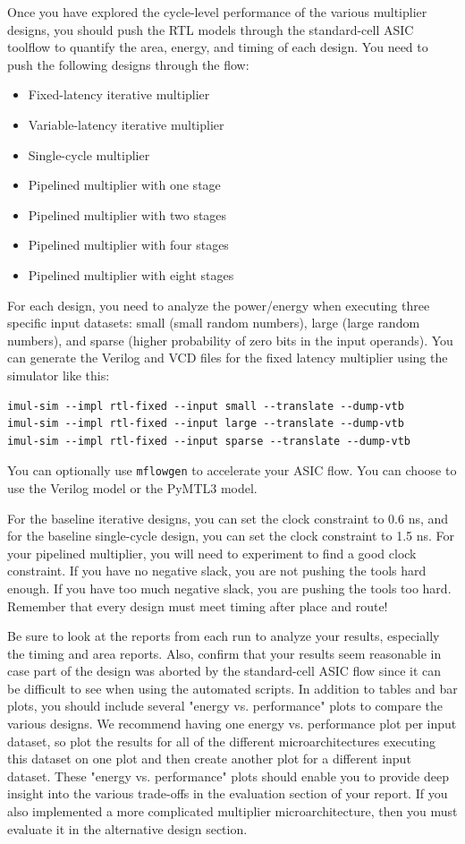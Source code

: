 \documentclass[a4paper,12pt,twoside]{article}
\begin{document}
Once you have explored the cycle-level performance of the various multiplier designs, you should push the RTL models through the standard-cell ASIC toolflow to quantify the area, energy, and timing of each design. You need to push the following designs through the flow:
\begin{itemize}
    \item Fixed-latency iterative multiplier
    \item Variable-latency iterative multiplier
    \item Single-cycle multiplier
    \item Pipelined multiplier with one stage
    \item Pipelined multiplier with two stages
    \item Pipelined multiplier with four stages
    \item Pipelined multiplier with eight stages
\end{itemize}
For each design, you need to analyze the power/energy when executing three specific input datasets: small (small random numbers), large (large random numbers), and sparse (higher probability of zero bits in the input operands). You can generate the Verilog and VCD files for the fixed latency multiplier using the simulator like this:
\begin{verbatim}
imul-sim --impl rtl-fixed --input small --translate --dump-vtb
imul-sim --impl rtl-fixed --input large --translate --dump-vtb
imul-sim --impl rtl-fixed --input sparse --translate --dump-vtb
\end{verbatim}
You can optionally use \texttt{mflowgen} to accelerate your ASIC flow. You can choose to use the Verilog model or the PyMTL3 model.

For the baseline iterative designs, you can set the clock constraint to 0.6 ns, and for the baseline single-cycle design, you can set the clock constraint to 1.5 ns. For your pipelined multiplier, you will need to experiment to find a good clock constraint. If you have no negative slack, you are not pushing the tools hard enough. If you have too much negative slack, you are pushing the tools too hard. Remember that every design must meet timing after place and route!

Be sure to look at the reports from each run to analyze your results, especially the timing and area reports. Also, confirm that your results seem reasonable in case part of the design was aborted by the standard-cell ASIC flow since it can be difficult to see when using the automated scripts. In addition to tables and bar plots, you should include several "energy vs. performance" plots to compare the various designs. We recommend having one energy vs. performance plot per input dataset, so plot the results for all of the different microarchitectures executing this dataset on one plot and then create another plot for a different input dataset. These "energy vs. performance" plots should enable you to provide deep insight into the various trade-offs in the evaluation section of your report. If you also implemented a more complicated multiplier microarchitecture, then you must evaluate it in the alternative design section.
\end{document}
